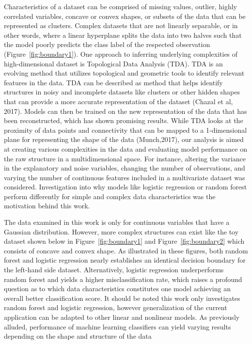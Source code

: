 \documentclass{llncs}
\begin{document}
Characteristics of a dataset can be comprised of missing values, outlier, highly correlated variables, concave or convex shapes, or subsets of the data that can be represented as clusters. Complex datasets that are not linearly separable, or in other words, where a linear hyperplane splits the data into two halves such that the model poorly predicts the class label of the respected observation (Figure~\ref{fig:boundary1}). One approach to inferring underlying complexities of high-dimensional dataset is Topological Data Analysis (TDA). TDA is an evolving method that utilizes topological and geometric tools to identify relevant features in the data. TDA can be described as method that helps identify structures in noisy and incomplete datasets like clusters or other hidden shapes that can provide a more accurate representation of the dataset (Chazal et al, 2017). Models can then be trained on the new representation of the data that has been reconstructed, which has shown promising results. While TDA looks at the proximity of data points and connectivity that can be mapped to a 1-dimensional plane for representing the shape of the data (Munch,2017), our analysis is aimed at creating various complexities in the data and evaluating model performance on the raw structure in a multidimensional space. For instance, altering the variance in the explanatory and noise variables, changing the number of observations, and varying the number of continuous features included in a multivariate dataset was considered. Investigation into why models like logistic regression or random forest perform differently for simple and complex data characteristics was the motivation behind this work.


The data examined in this work is only for continuous variables that have a Gaussian distribution. However, more complex structures can exist like the toy dataset shown below in Figure~\ref{fig:boundary1} and Figure~\ref{fig:boundary2} which consists of concave and convex shape. As illustrated in these figures, both random forest and logistic regression nearly establishes an identical decision boundary for the left-hand side dataset. Alternatively, logistic regression underperforms random forest and yields a higher misclassification rate, which raises a profound question as to which data characteristics constitutes one model achieving an overall better classification score. It should be noted this work only investigates random forest and logistic regression, however generalization of the current application can be adapted to other linear and nonlinear models. As previously alluded, performance of machine learning classifiers can yield varying results depending on the shape and structure of the data
\end{document}
